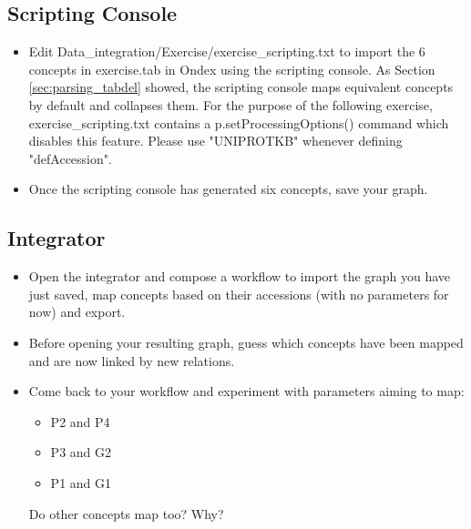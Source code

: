 \subsection{Scripting Console}
\begin{itemize}
\item Edit Data\_integration/Exercise/exercise\_scripting.txt to import the 6 concepts in exercise.tab in Ondex using the scripting console.
As Section \ref{sec:parsing_tabdel} showed, the scripting console maps equivalent concepts by default and collapses them. 
For the purpose of the following exercise, exercise\_scripting.txt contains a p.setProcessingOptions() command which disables this feature.
Please use "UNIPROTKB" whenever defining "defAccession".
\item Once the scripting console has generated six concepts, save your graph.
\end{itemize}

\subsection{Integrator}
\begin{itemize}
\item Open the integrator and compose a workflow to import the graph you have just saved, 
map concepts based on their accessions (with no parameters for now) and export. 
\item Before opening your resulting graph, guess which concepts have been mapped and are now linked by new relations.
\item Come back to your workflow and experiment with parameters aiming to map:
	\begin{itemize}
	\item P2 and P4
	\item P3 and G2
	\item P1 and G1
	\end{itemize}
Do other concepts map too? Why?	
\end{itemize}

